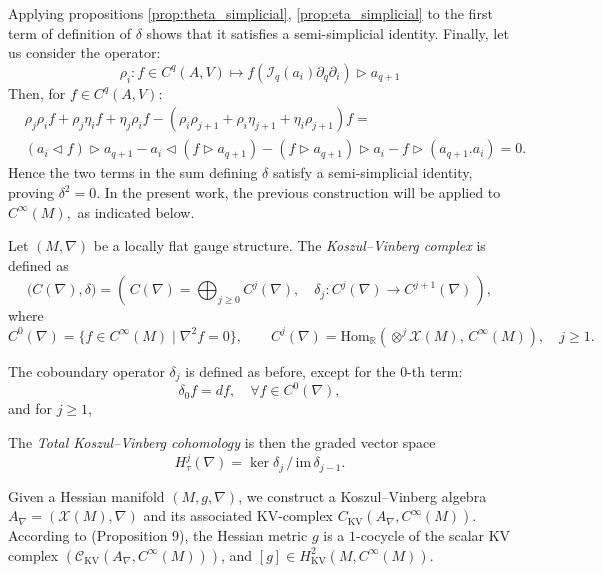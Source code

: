 Applying propositions \ref{prop:theta_simplicial}, \ref{prop:eta_simplicial} to the first term of definition of $\delta$ shows that it satisfies a semi-simplicial identity. Finally, let us consider the operator:
\begin{equation}
    \label{eq:rho_operator}
    \rho_i \colon f \in C^q(A,V) \mapsto f\left(\mathcal{I}_q(a_i)\partial_q \partial_i\right) \triangleright a_{q+1}
\end{equation}
Then, for $f \in C^q(A,V)$:
\begin{equation}
    \label{eq:rho_semi_simplicial}
    \begin{split}
    &\rho_j \rho_i f + \rho_j \eta_i f + \eta_j \rho_i f - \left( \rho_i \rho_{j+1} + \rho_i \eta_{j+1} + \eta_i \rho_{j+1} \right)f = \\
    &\left(a_i \triangleleft f\right) \triangleright a_{q+1} - a_i \triangleleft \left( f \triangleright a_{q+1} \right) -
    \left(f \triangleright a_{q+1}\right) \triangleright a_i 
    - f \triangleright \left( a_{q+1} . a_i \right) = 0.
    \end{split}
\end{equation}
Hence the two terms in the sum defining $\delta$ satisfy a semi-simplicial identity, proving $\delta^2=0.$
In the present work, the previous construction will be applied to $C^\infty(M),$ as indicated below.
\begin{defn}
Let $(M,\nabla)$ be a locally flat gauge structure. The \emph{Koszul--Vinberg complex} is defined as
\[
\bigl(C(\nabla), \delta \bigr) = \left( \, C(\nabla) = \bigoplus_{j \geq 0} C^j(\nabla),
\quad \delta_j : C^j(\nabla) \to C^{j+1}(\nabla) \,\right),
\]
where
\[
C^0(\nabla) = \{ f \in C^\infty(M) \mid \nabla^2 f = 0 \}, 
\qquad
C^j(\nabla) = \mathrm{Hom}_{\mathbb{R}}\!\left( \otimes^j \mathcal{X}(M), \, C^\infty(M)\right), 
\quad j \geq 1.
\]

The coboundary operator $\delta_j$ is defined as before, except for the $0$-th term:
\begin{equation}
\delta_0 f = df, \quad \forall f \in C^0(\nabla),
\end{equation}
and for $j \ge 1$,

The \emph{Total Koszul--Vinberg cohomology} is then the graded vector space
\begin{equation}
H^j_{\tau}(\nabla) = \ker \delta_j \, / \, \mathrm{im}\,\delta_{j-1}.
\end{equation}
\end{defn}

Given a Hessian manifold $(M, g, \nabla)$, we construct a Koszul–Vinberg algebra $A_{\nabla} = (\mathcal{X}(M), \nabla)$ and its associated KV-complex $C_{\mathrm{KV}}(A_{\nabla}, C^{\infty}(M))$.
According to \citep{boyom2024} (Proposition 9), the Hessian metric $g$ is a $1$-cocycle of the scalar KV complex $(\mathcal{C}_{\mathrm{KV}}(A_{\nabla}, C^{\infty}(M)))$, and $[g] \in H^{2}_{\mathrm{KV}}(M, C^{\infty}(M))$.
